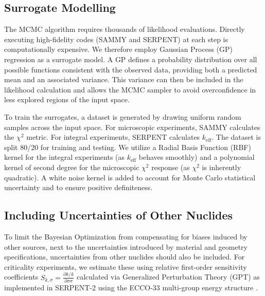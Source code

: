 \documentclass[preprint,review,12pt]{elsarticle}
\newcommand{\keff}{$k_\text{eff}$}
\begin{document}
\subsection{Surrogate Modelling}
The MCMC algorithm requires thousands of likelihood evaluations. Directly executing high-fidelity codes (SAMMY and SERPENT) at each step is computationally expensive. We therefore employ Gaussian Process (GP) regression as a surrogate model. A GP defines a probability distribution over all possible functions consistent with the observed data, providing both a predicted mean and an associated variance. This variance can then be included in the likelihood calculation and allows the MCMC sampler to avoid overconfidence in less explored regions of the input space. 

To train the surrogates, a dataset is generated by drawing uniform random samples across the input space. For microscopic experiments, SAMMY calculates the $\chi^2$ metric. For integral experiments, SERPENT calculates \keff{}. The dataset is split 80/20 for training and testing. We utilize a Radial Basis Function (RBF) kernel for the integral experiments (as \keff{} behaves smoothly) and a polynomial kernel of second degree for the microscopic $\chi^2$ response (as $\chi^2$  is inherently quadratic). A white noise kernel is added to account for Monte Carlo statistical uncertainty and to ensure positive definiteness.

\subsection{Including Uncertainties of Other Nuclides}
To limit the Bayesian Optimization from compensating for biases induced by other sources, next to the uncertainties introduced by material and geometry specifications, uncertainties from other nuclides should also be included. For criticality experiments, we estimate these using relative first-order sensitivity coefficients $S_{k,\sigma}=\frac{\partial k/k}{\partial \sigma \sigma}$ calculated via Generalized Perturbation Theory (GPT) as implemented in SERPENT-2 using the ECCO-33 multi-group energy structure \cite{aufieroCollisionHistorybasedApproach2015}.
\end{document}
